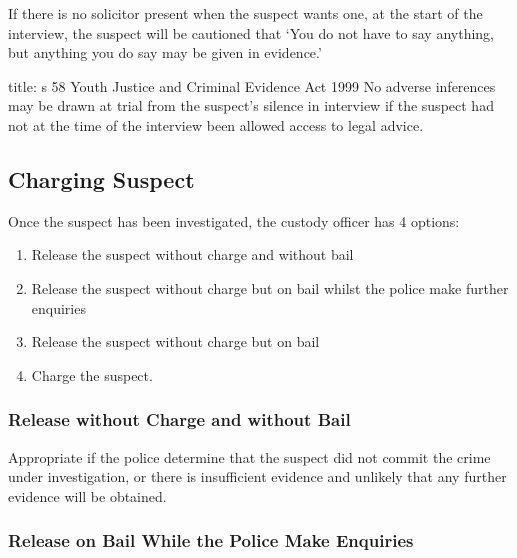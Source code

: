 \documentclass[
]{article}
\newenvironment{Shaded}{}{}
\newcommand{\NormalTok}[1]{#1}
\providecommand{\tightlist}{%
  \setlength{\itemsep}{0pt}\setlength{\parskip}{0pt}}
\begin{document}
If there is no solicitor present when the suspect wants one, at the
start of the interview, the suspect will be cautioned that `You do not
have to say anything, but anything you do say may be given in evidence.'

\begin{Shaded}
\begin{Highlighting}[]
\NormalTok{title: s 58 Youth Justice and Criminal Evidence Act 1999}
\NormalTok{No adverse inferences may be drawn at trial from the suspect’s silence in interview if the suspect had not at the time of the interview been allowed access to legal advice.}
\end{Highlighting}
\end{Shaded}

\hypertarget{charging-suspect}{%
\subsection{Charging Suspect}\label{charging-suspect}}

Once the suspect has been investigated, the custody officer has 4
options:

\begin{enumerate}
\def\labelenumi{\arabic{enumi}.}
\tightlist
\item
  Release the suspect without charge and without bail
\item
  Release the suspect without charge but on bail whilst the police make
  further enquiries
\item
  Release the suspect without charge but on bail
\item
  Charge the suspect.
\end{enumerate}

\hypertarget{release-without-charge-and-without-bail}{%
\subsubsection{Release without Charge and without
Bail}\label{release-without-charge-and-without-bail}}

Appropriate if the police determine that the suspect did not commit the
crime under investigation, or there is insufficient evidence and
unlikely that any further evidence will be obtained.

\hypertarget{release-on-bail-while-the-police-make-enquiries}{%
\subsubsection{Release on Bail While the Police Make
Enquiries}\label{release-on-bail-while-the-police-make-enquiries}}
\end{document}

